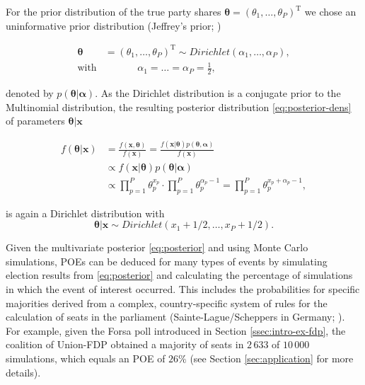 \documentclass[smallcondensed]{svjour3_edited}     %
\newcommand{\T}{\mathrm{\scriptscriptstyle T}}
\begin{document}
For the prior distribution of the true party shares $\boldsymbol{\theta}=(\theta_1,\ldots, \theta_P)^\T$
we chose an uninformative prior distribution
(Jeffrey's prior; \citet{gelman_2013})

\begin{equation}\label{eq:prior}
\begin{aligned}
\boldsymbol{\theta} &= (\theta_1,\ldots,\theta_P)^\T \sim Dirichlet(\alpha_1,\ldots,\alpha_P), \\
\text{with} &\ \ \ \ \ \ \ \ \ \ \ \ \ \ \ \alpha_1 = \ldots = \alpha_P = \frac{1}{2},
\end{aligned}
\end{equation}

denoted by $p(\boldsymbol{\theta}|\boldsymbol{\alpha})$.
As the Dirichlet distribution is a conjugate prior to the Multinomial distribution,
the resulting posterior distribution \eqref{eq:posterior-dens}  of parameters $\boldsymbol{\theta}|\mathbf{x}$

\begin{align}
f(\boldsymbol{\theta}|\mathbf{x})
  & = \frac{f(\mathbf{x}, \boldsymbol{\theta})}{f(\mathbf{x})}
    = \frac{f(\mathbf{x}|\boldsymbol{\theta})p(\boldsymbol{\theta}, \boldsymbol{\alpha})}{f(\mathbf{x})}\label{eq:posterior-dens}\\
  & \propto f(\mathbf{x}|\boldsymbol{\theta})p(\boldsymbol{\theta}|\boldsymbol{\alpha})\\
  & \propto \prod_{p=1}^{P}\theta_p^{x_p}\cdot \prod_{p=1}^{P}\theta_p^{\alpha_{p}-1} = \prod_{p=1}^{P}\theta_p^{x_p + \alpha_p-1},
\end{align}

is again a Dirichlet distribution with
\begin{equation}\label{eq:posterior}
\boldsymbol{\theta}|\mathbf{x} \sim Dirichlet(x_1 + 1/2,\ldots, x_P + 1/2).
\end{equation}

Given the multivariate posterior \eqref{eq:posterior} and using Monte Carlo
simulations, POEs can be deduced for many types of events by simulating
election results from \eqref{eq:posterior} and calculating the percentage of
simulations in which the event of interest occurred. This includes the
probabilities for specific majorities derived from a complex, country-specific
system of rules for the calculation of seats in the parliament
(Sainte-Lague/Scheppers in Germany; \citet{grofman_2003}). For example, given the
Forsa poll introduced in Section \ref{ssec:intro-ex-fdp}, the coalition of Union-FDP
obtained a majority of seats in $2\,633$ of $10\,000$ simulations, which equals
an POE of $26\%$ (see Section \ref{sec:application} for more details).\\
\end{document}
